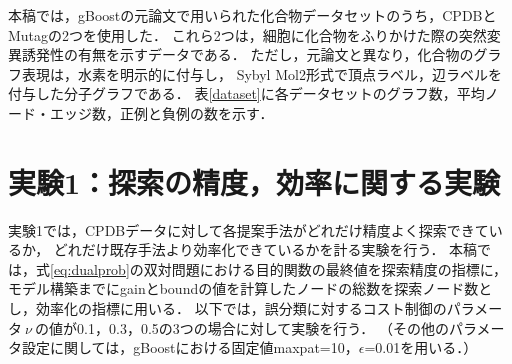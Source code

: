 本稿では，gBoostの元論文\cite{gBoost}で用いられた化合物データセットのうち，CPDBとMutagの2つを使用した．
これら2つは，細胞に化合物をふりかけた際の突然変異誘発性の有無を示すデータである．
ただし，元論文\cite{gBoost}と異なり，化合物のグラフ表現は，水素を明示的に付与し，
Sybyl Mol2形式で頂点ラベル，辺ラベルを付与した分子グラフである．
表\ref{dataset}に各データセットのグラフ数，平均ノード・エッジ数，正例と負例の数を示す．

\section{実験1：探索の精度，効率に関する実験}
実験1では，CPDBデータに対して各提案手法がどれだけ精度よく探索できているか，
どれだけ既存手法より効率化できているかを計る実験を行う．
本稿では，式\eqref{eq:dualprob}の双対問題における目的関数の最終値を探索精度の指標に，
モデル構築までにgainとboundの値を計算したノードの総数を探索ノード数とし，効率化の指標に用いる．
以下では，誤分類に対するコスト制御のパラメータ$\ \nu\ $の値が0.1，0.3，0.5の3つの場合に対して実験を行う．
（その他のパラメータ設定に関しては，gBoostにおける固定値maxpat=10，$\epsilon$=0.01を用いる．）

